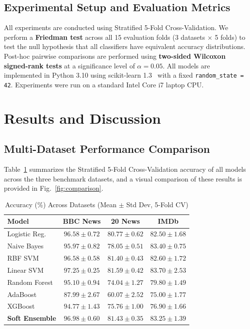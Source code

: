 \documentclass[conference]{IEEEtran}
\begin{document}
\subsection{Experimental Setup and Evaluation Metrics}

All experiments are conducted using Stratified 5-Fold Cross-Validation. We perform a \textbf{Friedman test} across all 15 evaluation folds (3 datasets $\times$ 5 folds) to test the null hypothesis that all classifiers have equivalent accuracy distributions. Post-hoc pairwise comparisons are performed using \textbf{two-sided Wilcoxon signed-rank tests} at a significance level of $\alpha = 0.05$. All models are implemented in Python 3.10 using scikit-learn 1.3~\cite{ref16} with a fixed \texttt{random\_state = 42}. Experiments were run on a standard Intel Core i7 laptop CPU.

\section{Results and Discussion}

\subsection{Multi-Dataset Performance Comparison}

Table~\ref{tab:results} summarizes the Stratified 5-Fold Cross-Validation accuracy of all models across the three benchmark datasets, and a visual comparison of these results is provided in Fig.~\ref{fig:comparison}.

\begin{table}[htbp]
  \caption{Accuracy (\%) Across Datasets (Mean $\pm$ Std Dev, 5-Fold CV)}
  \label{tab:results}
  \centering
  \small
  \begin{tabular}{lccc}
    \toprule
    \textbf{Model} & \textbf{BBC News} & \textbf{20 News} & \textbf{IMDb} \\
    \midrule
    Logistic Reg.  & $96.58 \pm 0.72$ & $80.77 \pm 0.62$ & $82.50 \pm 1.68$ \\
    Naive Bayes    & $95.97 \pm 0.82$ & $78.05 \pm 0.51$ & $83.40 \pm 0.75$ \\
    RBF SVM        & $96.58 \pm 0.58$ & $81.40 \pm 0.43$ & $82.60 \pm 1.72$ \\
    Linear SVM     & $97.25 \pm 0.25$ & $81.59 \pm 0.42$ & $83.70 \pm 2.53$ \\
    Random Forest  & $95.10 \pm 0.94$ & $74.04 \pm 1.27$ & $79.80 \pm 1.49$ \\
    AdaBoost       & $87.99 \pm 2.67$ & $60.07 \pm 2.52$ & $75.00 \pm 1.77$ \\
    XGBoost        & $94.77 \pm 1.43$ & $75.76 \pm 1.00$ & $76.90 \pm 1.66$ \\
    \textbf{Soft Ensemble} & $\mathbf{96.98 \pm 0.60}$ & $\mathbf{81.43 \pm 0.35}$ & $\mathbf{83.25 \pm 1.39}$ \\
    \bottomrule
  \end{tabular}
\end{table}
\end{document}
